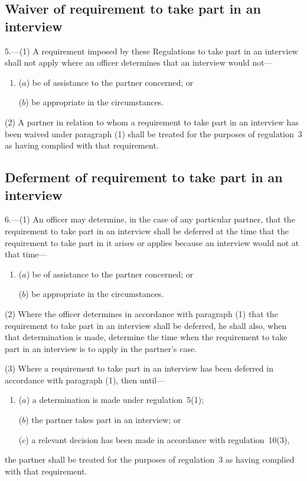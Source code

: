 \documentclass[12pt,a4paper]{article}
\begin{document}
\subsection[5. Waiver of requirement to take part in an interview]{Waiver of requirement to take part in an interview}

5.---(1)  A requirement imposed by these Regulations to take part in an interview shall not apply where an officer determines that an interview would not—
\begin{enumerate}\item[]
($a$) be of assistance to the partner concerned; or

($b$) be appropriate in the circumstances.
\end{enumerate}

(2) A partner in relation to whom a requirement to take part in an interview has been waived under paragraph (1) shall be treated for the purposes of regulation~3 as having complied with that requirement.

\subsection[6. Deferment of requirement to take part in an interview]{Deferment of requirement to take part in an interview}

6.---(1)  An officer may determine, in the case of any particular partner, that the requirement to take part in an interview shall be deferred at the time that the requirement to take part in it arises or applies because an interview would not at that time—
\begin{enumerate}\item[]
($a$) be of assistance to the partner concerned; or

($b$) be appropriate in the circumstances.
\end{enumerate}

(2) Where the officer determines in accordance with paragraph (1) that the requirement to take part in an interview shall be deferred, he shall also, when that determination is made, determine the time when the requirement to take part in an interview is to apply in the partner’s case.

(3) Where a requirement to take part in an interview has been deferred in accordance with paragraph (1), then until—
\begin{enumerate}\item[]
($a$) a determination is made under regulation~5(1);

($b$) the partner takes part in an interview; or

($c$) a relevant decision has been made in accordance with regulation~10(3),
\end{enumerate}
the partner shall be treated for the purposes of regulation~3 as having complied with that requirement.
\end{document}
